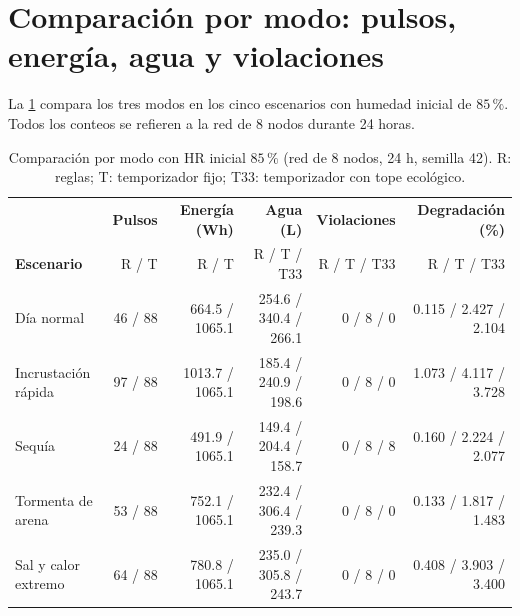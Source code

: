 \section{Comparaci\'on por modo: pulsos, energ\'ia, agua y violaciones}
\label{sec:comparacion_modos}
La \cref{tab:modos} compara los tres modos en los cinco escenarios con humedad inicial de $85\,\%$. Todos los conteos se refieren a la red de 8 nodos durante 24 horas.

\begin{table}[htbp]
\centering
\footnotesize
\caption{Comparaci\'on por modo con HR inicial $85\,\%$ (red de 8 nodos, 24 h, semilla 42). R: reglas; T: temporizador fijo; T33: temporizador con tope ecol\'ogico.}
\label{tab:modos}
\begin{tabular*}{\textwidth}{@{\extracolsep{\fill}}lrrrrr@{}}
\toprule
 & \textbf{Pulsos} & \textbf{Energ\'ia (Wh)} & \textbf{Agua (L)} & \textbf{Violaciones} & \textbf{Degradaci\'on (\%)} \\
\textbf{Escenario} & R / T & R / T & R / T / T33 & R / T / T33 & R / T / T33 \\
\midrule
D\'ia normal & 46 / 88 & 664.5 / 1065.1 & 254.6 / 340.4 / 266.1 & 0 / 8 / 0 & 0.115 / 2.427 / 2.104 \\
Incrustaci\'on r\'apida & 97 / 88 & 1013.7 / 1065.1 & 185.4 / 240.9 / 198.6 & 0 / 8 / 0 & 1.073 / 4.117 / 3.728 \\
Sequ\'ia & 24 / 88 & 491.9 / 1065.1 & 149.4 / 204.4 / 158.7 & 0 / 8 / 8 & 0.160 / 2.224 / 2.077 \\
Tormenta de arena & 53 / 88 & 752.1 / 1065.1 & 232.4 / 306.4 / 239.3 & 0 / 8 / 0 & 0.133 / 1.817 / 1.483 \\
Sal y calor extremo & 64 / 88 & 780.8 / 1065.1 & 235.0 / 305.8 / 243.7 & 0 / 8 / 0 & 0.408 / 3.903 / 3.400 \\
\bottomrule
\end{tabular*}
\end{table}

